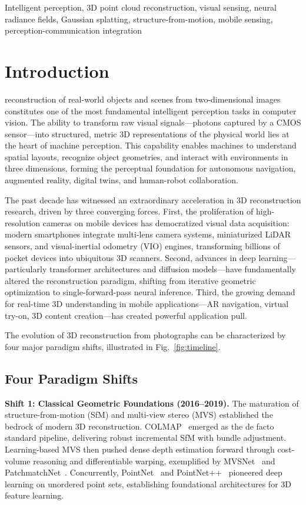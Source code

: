 \documentclass[journal]{IEEEtran}
\begin{document}
\begin{IEEEkeywords}
Intelligent perception, 3D point cloud reconstruction, visual sensing, neural radiance fields, Gaussian splatting, structure-from-motion, mobile sensing, perception-communication integration
\end{IEEEkeywords}

\section{Introduction}
 reconstruction of real-world objects and scenes from two-dimensional images constitutes one of the most fundamental intelligent perception tasks in computer vision. The ability to transform raw visual signals---photons captured by a CMOS sensor---into structured, metric 3D representations of the physical world lies at the heart of machine perception. This capability enables machines to understand spatial layouts, recognize object geometries, and interact with environments in three dimensions, forming the perceptual foundation for autonomous navigation, augmented reality, digital twins, and human-robot collaboration.

The past decade has witnessed an extraordinary acceleration in 3D reconstruction research, driven by three converging forces. First, the proliferation of high-resolution cameras on mobile devices has democratized visual data acquisition: modern smartphones integrate multi-lens camera systems, miniaturized LiDAR sensors, and visual-inertial odometry (VIO) engines, transforming billions of pocket devices into ubiquitous 3D scanners. Second, advances in deep learning---particularly transformer architectures and diffusion models---have fundamentally altered the reconstruction paradigm, shifting from iterative geometric optimization to single-forward-pass neural inference. Third, the growing demand for real-time 3D understanding in mobile applications---AR navigation, virtual try-on, 3D content creation---has created powerful application pull.

The evolution of 3D reconstruction from photographs can be characterized by four major paradigm shifts, illustrated in Fig.~\ref{fig:timeline}.

\subsection{Four Paradigm Shifts}

\textbf{Shift 1: Classical Geometric Foundations (2016--2019).} The maturation of structure-from-motion (SfM) and multi-view stereo (MVS) established the bedrock of modern 3D reconstruction. COLMAP~\cite{colmap} emerged as the de facto standard pipeline, delivering robust incremental SfM with bundle adjustment. Learning-based MVS then pushed dense depth estimation forward through cost-volume reasoning and differentiable warping, exemplified by MVSNet~\cite{mvsnet} and PatchmatchNet~\cite{patchmatchnet}. Concurrently, PointNet~\cite{pointnet} and PointNet++~\cite{pointnet++} pioneered deep learning on unordered point sets, establishing foundational architectures for 3D feature learning.
\end{document}
